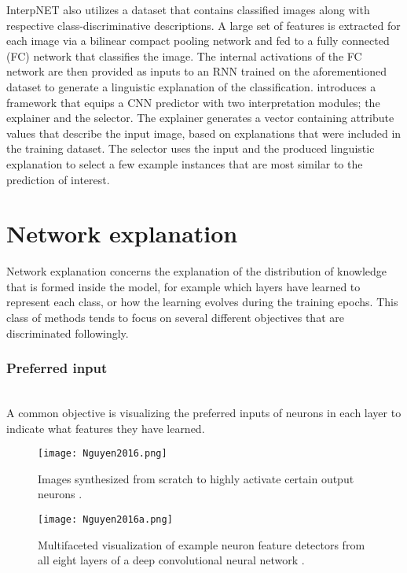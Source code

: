 \documentclass[journal]{IEEEtran}
\begin{document}
InterpNET \cite{Barratt2017} also utilizes a dataset that contains classified images along with respective class-discriminative descriptions. A large set of features is extracted for each image via a bilinear compact pooling network and fed to a fully connected (FC) network that classifies the image. The internal activations of the FC network are then provided as inputs to an RNN trained on the aforementioned dataset to generate a linguistic explanation of the classification.
\cite{Kanehira2019a} introduces a framework that equips a CNN predictor with two interpretation modules; the explainer and the selector. The explainer generates a vector containing attribute values that describe the input image, based on explanations that were included in the training dataset. The selector uses the input and the produced linguistic explanation to select a few example instances that are most similar to the prediction of interest. 

\section{Network explanation}
Network explanation concerns the explanation of the distribution of knowledge that is formed inside the model, for example which layers have learned to represent each class, or how the learning evolves during the training epochs. This class of methods tends to focus on several different objectives that are discriminated followingly. 

\subsubsection{Preferred input}
\hfill\\
A common objective is visualizing the preferred inputs of neurons in each layer to indicate what features they have learned. 

\begin{figure}[h!]
  \texttt{[image: Nguyen2016.png]}
  \caption{Images synthesized from scratch to highly activate certain output neurons \cite{Nguyen2016}.}
\end{figure}

\begin{figure}[h!]
  \texttt{[image: Nguyen2016a.png]}
  \caption{Multifaceted visualization of example neuron feature detectors from all eight layers of a deep convolutional neural network \cite{Nguyen2016a}.}
\end{figure}
\end{document}

